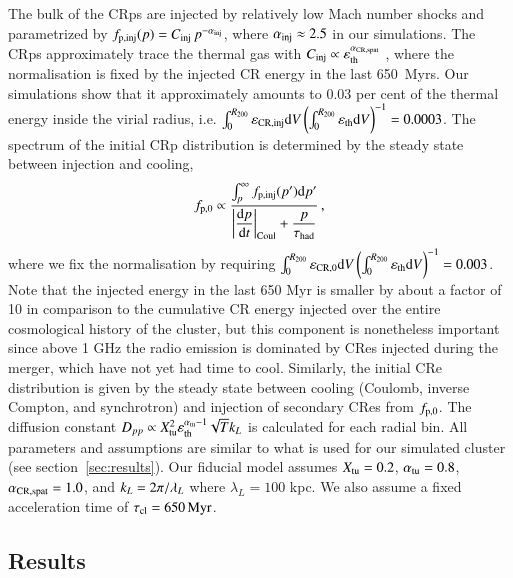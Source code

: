 \documentclass[fleqn,usenatbib,useAMS]{mnras}
\newcommand{\eps}{\varepsilon}
\begin{document}
The bulk of the CRps are injected by relatively low Mach number shocks
and parametrized by $f_{\mathrm{p,inj}}(p) =
C_{\mathrm{inj}}\,p^{-\alpha_{\mathrm{inj}}}$, where $\alpha_{\mathrm{inj}}\approx
2.5$ in our simulations. The CRps approximately trace the thermal gas
with $C_\rmn{inj} \propto \eps_\rmn{th}^{\alpha_\rmn{CR,spat}}$
\citep{pinzke10,2016MNRAS.459...70V}, where the normalisation is fixed
by the injected CR energy in the last 650~Myrs. Our simulations show
that it approximately amounts to 0.03 per cent of the thermal energy inside
the virial radius, i.e.  $\int_0^{R_{200}}\eps_\rmn{CR,inj} \rmn{d}
V\left(\int_0^{R_{200}}\eps_\rmn{th} \rmn{d}V\right)^{-1} =
0.0003$. The spectrum of the initial CRp distribution is determined by
the steady state between injection and cooling,
\begin{equation}
 f_{\mathrm{p,0}} \propto \frac{\int_p^\infty f_{\mathrm{p,inj}}(p') 
{\mathrm{d}}p'}{\displaystyle\left|{{{\mathrm{d}}p}\over{{\mathrm{d}}t}}\right|_{\rm Coul}+\frac{p}{\tau_{\rm had}}}\,,
\end{equation}
where we fix the normalisation by requiring $\int_0^{R_{200}}\eps_\rmn{CR,0}
\rmn{d}V\left(\int_0^{R_{200}}\eps_\rmn{th} \rmn{d}V\right)^{-1} = 0.003$. Note
that the injected energy in the last 650 Myr is smaller by about a factor of 10
in comparison to the cumulative CR energy injected over the entire cosmological
history of the cluster, but this component is nonetheless important since above
1 GHz the radio emission is dominated by CRes injected during the merger, which
have not yet had time to cool.  Similarly, the initial CRe distribution is given
by the steady state between cooling (Coulomb, inverse Compton, and synchrotron)
and injection of secondary CRes from $f_{\mathrm{p,0}}$.  The diffusion constant
$D_{pp} \propto X_{\rm tu}^{2} \eps_{\rm th}^{\alpha_{\rm tu}-1} \sqrt{T} k_L$ is
calculated for each radial bin. All parameters and assumptions are similar to
what is used for our simulated cluster (see section~\ref{sec:results}). Our
fiducial model assumes $X_{\rm tu} = 0.2$, $\alpha_{\rm tu} =0.8$, $\alpha_{\rm
  CR, spat}=1.0$, and $k_L=2 \pi/\lambda_L$ where $\lambda_L=100$ kpc. We also
assume a fixed acceleration time of $\tau_{\rm cl} = 650 \, {\rm Myr}$.


\subsection{Results}
\end{document}
